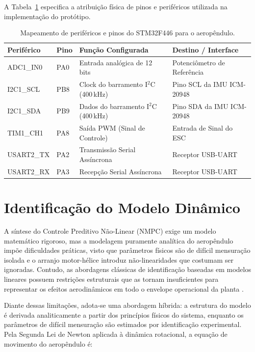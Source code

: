 A Tabela~\ref{tab:perifericos_stm32} especifica a atribuição física de pinos e periféricos utilizada na implementação do protótipo.

\begin{table}[h]
    \centering
    \caption{Mapeamento de periféricos e pinos do STM32F446 para o aeropêndulo.}
    \label{tab:perifericos_stm32}
    \begin{tabularx}{\textwidth}{llXX}
        \hline
        \textbf{Periférico} & \textbf{Pino} & \textbf{Função Configurada} & \textbf{Destino / Interface} \\
        \hline
        ADC1\_IN0  & PA0  & Entrada analógica de 12 bits & Potenciômetro de Referência \\
        I2C1\_SCL  & PB8  & Clock do barramento I$^2$C (400\,kHz) & Pino SCL da IMU ICM-20948 \\
        I2C1\_SDA  & PB9  & Dados do barramento I$^2$C (400\,kHz) & Pino SDA da IMU ICM-20948 \\
        TIM1\_CH1  & PA8  & Saída PWM (Sinal de Controle) & Entrada de Sinal do ESC \\
        USART2\_TX & PA2  & Transmissão Serial Assíncrona & Receptor USB-UART \\
        USART2\_RX & PA3  & Recepção Serial Assíncrona    & Receptor USB-UART \\
        \hline
    \end{tabularx}
\end{table}


\section{Identificação do Modelo Dinâmico}

A síntese do Controle Preditivo Não-Linear (NMPC) exige um modelo matemático rigoroso, mas a modelagem puramente analítica do aeropêndulo impõe dificuldades práticas, visto que parâmetros físicos são de difícil mensuração isolada e o arranjo motor-hélice introduz não-linearidades que costumam ser ignoradas. Contudo, as abordagens clássicas de identificação baseadas em modelos lineares possuem restrições estruturais que as tornam insuficientes para representar os efeitos aerodinâmicos em todo o envelope operacional da planta \cite{jiang2022}.

Diante dessas limitações, adota-se uma abordagem híbrida: a estrutura do modelo é derivada analiticamente a partir dos princípios físicos do sistema, enquanto os parâmetros de difícil mensuração são estimados por identificação experimental. Pela Segunda Lei de Newton aplicada à dinâmica rotacional, a equação de movimento do aeropêndulo é:

